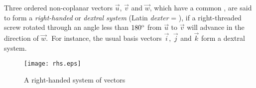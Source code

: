 \documentclass[12pt]{article}
\begin{document}
Three ordered non-coplanar vectors $\vec{u}$, $\vec{v}$ and $\vec{w}$, which have a common , are said to form a {\em right-handed} or {\em dextral system} (Latin {\em dexter} = ), if a right-threaded screw rotated through an angle less than $180^{\rm{o}}$ from $\vec{u}$ to $\vec{v}$ will advance in the direction of $\vec{w}$.\, For instance, the usual basis vectors $\vec{i}$, $\vec{j}$ and $\vec{k}$ form a dextral system.

\begin{figure}
\begin{center}
\texttt{[image: rhs.eps]}
\end{center}
\caption{A right-handed system of vectors}
\end{figure}

\end{document}
